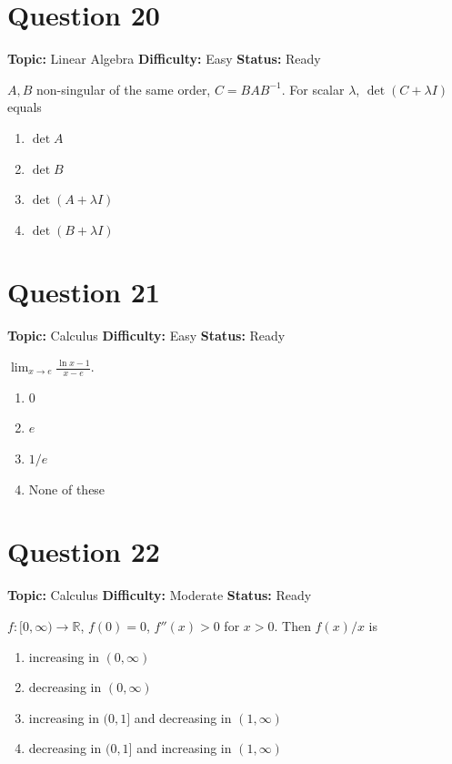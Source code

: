 \documentclass[11pt]{article}
\begin{document}
\newpage

\section*{Question 20}


\noindent\textbf{Topic:} Linear Algebra \quad \textbf{Difficulty:} Easy \quad \textbf{Status:} Ready



$A, B$ non-singular of the same order, $C = B A B^{-1}$. For scalar $\lambda$, $\det(C + \lambda I)$ equals
\begin{enumerate}[label=(\Alph*)]
\item $\det A$
\item $\det B$
\item $\det(A + \lambda I)$
\item $\det(B + \lambda I)$
\end{enumerate}

\newpage

\section*{Question 21}


\noindent\textbf{Topic:} Calculus \quad \textbf{Difficulty:} Easy \quad \textbf{Status:} Ready



$\displaystyle \lim_{x \to e} \frac{\ln x - 1}{x - e}$.
\begin{enumerate}[label=(\Alph*)]
\item $0$
\item $e$
\item $1/e$
\item None of these
\end{enumerate}

\newpage

\section*{Question 22}


\noindent\textbf{Topic:} Calculus \quad \textbf{Difficulty:} Moderate \quad \textbf{Status:} Ready



$f : [0,\infty) \to \mathbb R$, $f(0) = 0$, $f''(x) > 0$ for $x > 0$. Then $f(x)/x$ is
\begin{enumerate}[label=(\Alph*)]
\item increasing in $(0,\infty)$
\item decreasing in $(0,\infty)$
\item increasing in $(0,1]$ and decreasing in $(1,\infty)$
\item decreasing in $(0,1]$ and increasing in $(1,\infty)$
\end{enumerate}
\end{document}
